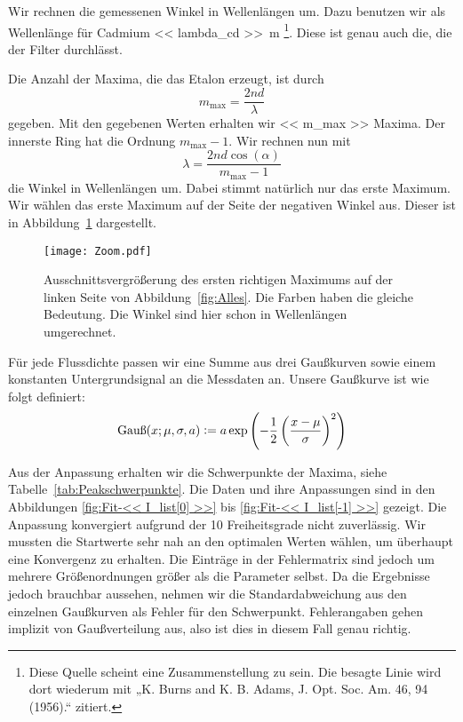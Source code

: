 Wir rechnen die gemessenen Winkel in Wellenlängen um. Dazu benutzen wir als
Wellenlänge für Cadmium \SI{<< lambda_cd >>}{\meter}
\parencite{NIST/Strong_Lines_of_Cadmium} \footnote{%
    Diese Quelle scheint eine Zusammenstellung zu sein. Die besagte Linie wird
    dort wiederum mit „K. Burns and K. B. Adams, J. Opt. Soc. Am. 46, 94
    (1956).“ zitiert.
}. Diese ist genau auch die, die der Filter durchlässt.

Die Anzahl der Maxima, die das Etalon erzeugt, ist durch
\[
    m_\text{max} = \frac{2nd}{\lambda}
\]
gegeben. Mit den gegebenen Werten erhalten wir \num{<< m_max >>} Maxima. Der
innerste Ring hat die Ordnung $m_\text{max} - 1$. Wir rechnen nun mit
\[
    \lambda = \frac{2 n d \cos(\alpha)}{m_\text{max} - 1}
\]
die Winkel in Wellenlängen um. Dabei stimmt natürlich nur das erste Maximum. Wir
wählen das erste Maximum auf der Seite der negativen Winkel aus. Dieser ist in
Abbildung~\ref{fig:Zoom} dargestellt.

\begin{figure}[htbp]
    \centering
    \texttt{[image: Zoom.pdf]}
    \caption{%
        Ausschnittsvergrößerung des ersten richtigen Maximums auf der linken
        Seite von Abbildung~\ref{fig:Alles}. Die Farben haben die gleiche
        Bedeutung. Die Winkel sind hier schon in Wellenlängen umgerechnet.
    }
    \label{fig:Zoom}
\end{figure}

Für jede Flussdichte passen wir eine Summe aus drei Gaußkurven sowie einem
konstanten Untergrundsignal an die Messdaten an. Unsere Gaußkurve ist wie folgt
definiert:
\begin{equation}
    \label{eq:gauss}
    \mathop{\text{Gauß}} (x; \mu, \sigma, a)
    := a \exp\del{- \frac12 \del{\frac{x-\mu}{\sigma}}^2}
\end{equation}

Aus der Anpassung erhalten wir die Schwerpunkte der Maxima, siehe
Tabelle~\ref{tab:Peakschwerpunkte}. Die Daten und ihre Anpassungen sind in den
Abbildungen \ref{fig:Fit-<< I_list[0] >>} bis \ref{fig:Fit-<< I_list[-1] >>}
gezeigt. Die Anpassung konvergiert aufgrund der 10 Freiheitsgrade nicht
zuverlässig. Wir mussten die Startwerte sehr nah an den optimalen Werten
wählen, um überhaupt eine Konvergenz zu erhalten. Die Einträge in der
Fehlermatrix sind jedoch um mehrere Größenordnungen größer als die Parameter
selbst. Da die Ergebnisse jedoch brauchbar aussehen, nehmen wir die
Standardabweichung aus den einzelnen Gaußkurven als Fehler für den Schwerpunkt.
Fehlerangaben gehen implizit von Gaußverteilung aus, also ist dies in diesem
Fall genau richtig.

